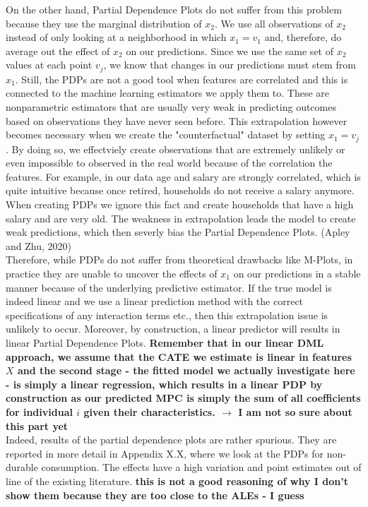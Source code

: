 On the other hand, Partial Dependence Plots do not suffer from this problem because they use the marginal distribution of $x_2$. We use all observations of $x_2$ instead of only looking at a neighborhood in which $x_1=v_1$ and, therefore, do average out the effect of $x_2$ on our predictions. Since we use the same set of $x_2$ values at each point $v_j$, we know that changes in our predictions must stem from $x_1.$ Still, the PDPs are not a good tool when features are correlated and this is connected to the machine learning estimators we apply them to. These are nonparametric estimators that are usually very weak in predicting outcomes based on observations they have never seen before. This extrapolation however becomes necessary when we create the "counterfactual" dataset by setting $x_1=v_j$. By doing so, we effectviely create observations that are extremely unlikely or even impossible to observed in the real world because of the correlation the features. For example, in our data age and salary are strongly correlated, which is quite intuitive because once retired, households do not receive a salary anymore. When creating PDPs we ignore this fact and create households that have a high salary and are very old. The weakness in extrapolation leads the model to create weak predictions, which then severly bias the Partial Dependence Plots. (Apley and Zhu, 2020)  \\
Therefore, while PDPs do not suffer from theoretical drawbacks like M-Plots, in practice they are unable to uncover the effects of $x_1$ on our predictions in a stable manner because of the underlying predictive estimator. If the true model is indeed linear and we use a linear prediction method with the correct specifications of any interaction terms etc., then this extrapolation issue is unlikely to occur. Moreover, by construction, a linear predictor will results in linear Partial Dependence Plots. \textbf{Remember that in our linear DML approach, we assume that the CATE we estimate is linear in features $X$ and the second stage - the fitted model we actually investigate here - is simply a linear regression, which results in a linear PDP by construction as our predicted MPC is simply the sum of all coefficients for individual $i$ given their characteristics. $\rightarrow$ I am not so sure about this part yet} \\
Indeed, results of the partial dependence plots are rather spurious. They are reported in more detail in Appendix X.X, where we look at the PDPs for non-durable consumption. The effects have a high variation and point estimates out of line of the existing literature. \textbf{this is not a good reasoning of why I don't show them because they are too close to the ALEs - I guess}

